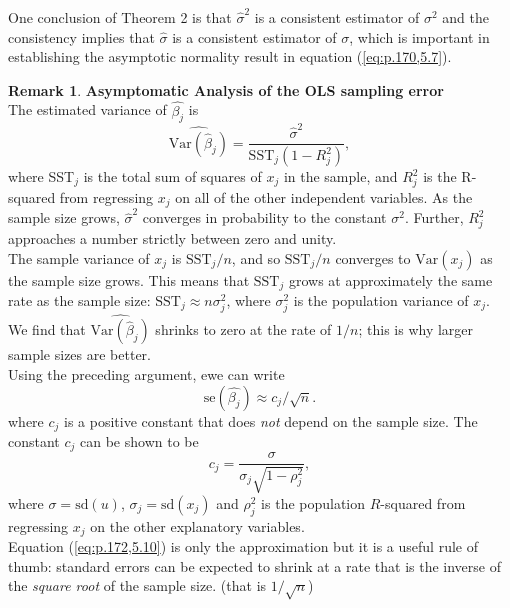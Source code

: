 \documentclass[a4paper, 10pt]{article}
\theoremstyle{definition}	%
\newtheorem*{remark}{Remark}
\begin{document}
One conclusion of Theorem 2 is that $\hat{\sigma}^2$ is a consistent estimator of $\sigma^2$ and the consistency implies that $\hat{\sigma}$ is a consistent estimator of $\sigma$, which is important in establishing the asymptotic normality result in equation (\ref{eq:p.170,5.7}).
\begin{remark}
    \textbf{Asymptomatic Analysis of the OLS sampling error}\\
    The estimated variance of $\hat{\beta_j}$ is 
    \begin{equation}
        \widehat{\text{Var}(\hat{\beta}_j)} = \frac{\hat{\sigma}^2}{\text{SST}_j(1 - R_j^2)}, \label{eq:p.171,5.9}
    \end{equation}
    where SST$_j$ is the total sum of squares of $x_j$ in the sample, and $R_j^2$ is the R-squared from regressing $x_j$ on all of the other independent variables. As the sample size grows, $\hat{\sigma}^2$ converges in probability to the constant $\sigma^2$. Further, $R_j^2$ approaches a number strictly between zero and unity.\\
    The sample variance of $x_j$ is $\text{SST}_j / n$, and so $\text{SST}_j / n$ converges to $\text{Var}(x_j)$ as the sample size grows. This means that $\text{SST}_j$ grows at approximately the same rate as the sample size: $\text{SST}_j \approx n\sigma_j^2$, where $\sigma_j^2$ is the population variance of $x_j$. We find that $\widehat{\text{Var}(\hat{\beta}_j)}$ shrinks to zero at the rate of $1/n$; this is why larger sample sizes are better.\\
    Using the preceding argument, ewe can write 
    \begin{equation}
        \text{se}(\hat{\beta_j}) \approx c_j/\sqrt{n}. \label{eq:p.172,5.10}
    \end{equation}
    where $c_j$ is a positive constant that does \textit{not} depend on the sample size. The constant $c_j$ can be shown to be
    \begin{equation*}
        c_j = \frac{\sigma}{\sigma_j\sqrt{1-\rho_j^2}},
    \end{equation*}
    where $\sigma = \text{sd}(u)$, $\sigma_j = \text{sd}(x_j)$ and $\rho_j^2$ is the population $R$-squared from regressing $x_j$ on the other explanatory variables.\\
    Equation (\ref{eq:p.172,5.10}) is only the approximation but it is a useful rule of thumb: standard errors can be expected to shrink at a rate that is the inverse of the \textit{square root} of the sample size. (that is $1/\sqrt{n}$)
\end{remark}
\end{document}
